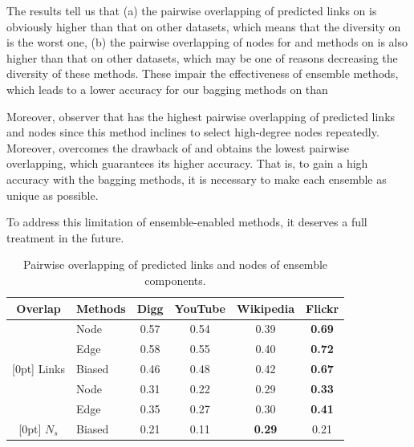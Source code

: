 The results tell us that (a) the pairwise overlapping of predicted links on \Flickr is
obviously higher than that on other datasets, which means that the diversity on \Flickr is the
worst one, (b) the pairwise overlapping of nodes for
\Node and \Edge methods on \Flickr is also higher than that on other datasets, which may be
one of reasons decreasing the diversity of these methods. These impair the effectiveness of ensemble methods,
which leads to a lower accuracy for our bagging methods on \Flickr than \NMF

Moreover, observer that \Edge has the highest
pairwise overlapping of predicted links and nodes since this method inclines to select high-degree
nodes repeatedly. Moreover, \Biased overcomes the drawback of \Edge and obtains the lowest pairwise
overlapping, which guarantees its higher accuracy. That is, to gain a high accuracy with the bagging methods, it
is necessary to make each ensemble as unique as possible. 

To address this limitation of ensemble-enabled methods, it deserves a full treatment in the future.




\begin{table}
\caption{Pairwise overlapping of predicted links and nodes of ensemble components.}
\label{tab_limitations}
\vspace{0ex}
\centering
\newcommand{\tabincell}[2]{\begin{tabular}{@{}#1@{}}#2\end{tabular}}
\begin{tabular}{c|l|c|c|c|c}
\hline \hline Overlap & Methods & Digg & YouTube & Wikipedia & Flickr \\
\hline \hline
& Node & 0.57 & 0.54 & 0.39 & \textbf{0.69} \\
& Edge & 0.58 & 0.55 & 0.40 & \textbf{0.72} \\
\raisebox{2.5ex}[0pt]{ Links } & Biased & 0.46 & 0.48 & 0.42 & \textbf{0.67} \\
\hline
& Node & 0.31 & 0.22 & 0.29 & \textbf{0.33} \\
& Edge & 0.35 & 0.27 & 0.30 & \textbf{0.41} \\
\raisebox{2.5ex}[0pt]{ $N_s$ } & Biased & 0.21 & 0.11 & \textbf{0.29} & 0.21 \\
\hline \hline
\end{tabular}
\vspace{-2ex}
\end{table}




